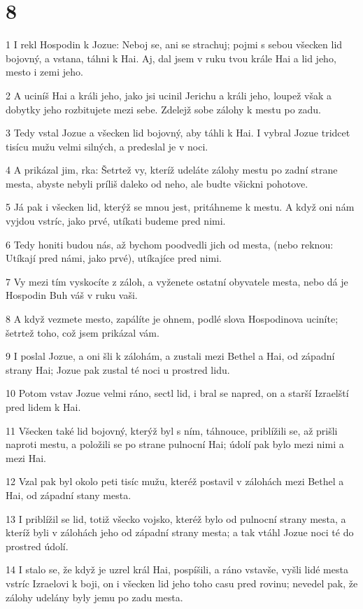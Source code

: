 \chapter{8}

\par 1 I rekl Hospodin k Jozue: Neboj se, ani se strachuj; pojmi s sebou všecken lid bojovný, a vstana, táhni k Hai. Aj, dal jsem v ruku tvou krále Hai a lid jeho, mesto i zemi jeho.
\par 2 A uciníš Hai a králi jeho, jako jsi ucinil Jerichu a králi jeho, loupež však a dobytky jeho rozbitujete mezi sebe. Zdelejž sobe zálohy k mestu po zadu.
\par 3 Tedy vstal Jozue a všecken lid bojovný, aby táhli k Hai. I vybral Jozue tridcet tisícu mužu velmi silných, a predeslal je v noci.
\par 4 A prikázal jim, rka: Šetrtež vy, kteríž udeláte zálohy mestu po zadní strane mesta, abyste nebyli príliš daleko od neho, ale budte všickni pohotove.
\par 5 Já pak i všecken lid, kterýž se mnou jest, pritáhneme k mestu. A když oni nám vyjdou vstríc, jako prvé, utíkati budeme pred nimi.
\par 6 Tedy honiti budou nás, až bychom poodvedli jich od mesta, (nebo reknou: Utíkají pred námi, jako prvé), utíkajíce pred nimi.
\par 7 Vy mezi tím vyskocíte z záloh, a vyženete ostatní obyvatele mesta, nebo dá je Hospodin Buh váš v ruku vaši.
\par 8 A když vezmete mesto, zapálíte je ohnem, podlé slova Hospodinova uciníte; šetrtež toho, což jsem prikázal vám.
\par 9 I poslal Jozue, a oni šli k zálohám, a zustali mezi Bethel a Hai, od západní strany Hai; Jozue pak zustal té noci u prostred lidu.
\par 10 Potom vstav Jozue velmi ráno, sectl lid, i bral se napred, on a starší Izraelští pred lidem k Hai.
\par 11 Všecken také lid bojovný, kterýž byl s ním, táhnouce, priblížili se, až prišli naproti mestu, a položili se po strane pulnocní Hai; údolí pak bylo mezi nimi a mezi Hai.
\par 12 Vzal pak byl okolo peti tisíc mužu, kteréž postavil v zálohách mezi Bethel a Hai, od západní stany mesta.
\par 13 I priblížil se lid, totiž všecko vojsko, kteréž bylo od pulnocní strany mesta, a kteríž byli v zálohách jeho od západní strany mesta; a tak vtáhl Jozue noci té do prostred údolí.
\par 14 I stalo se, že když je uzrel král Hai, pospíšili, a ráno vstavše, vyšli lidé mesta vstríc Izraelovi k boji, on i všecken lid jeho toho casu pred rovinu; nevedel pak, že zálohy udelány byly jemu po zadu mesta.
